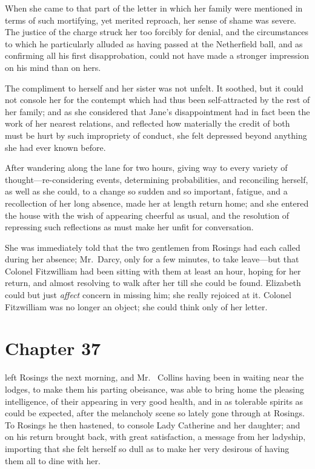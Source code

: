 When she came to that part of the letter in which her family were
mentioned in terms of such mortifying, yet merited reproach, her
sense of shame was severe.  The justice of the charge struck her
too forcibly for denial, and the circumstances to which he
particularly alluded as having passed at the Netherfield ball,
and as confirming all his first disapprobation, could not have
made a stronger impression on his mind than on hers.

The compliment to herself and her sister was not unfelt.  It
soothed, but it could not console her for the contempt which had
thus been self-attracted by the rest of her family; and as she
considered that Jane's disappointment had in fact been the work
of her nearest relations, and reflected how materially the credit
of both must be hurt by such impropriety of conduct, she felt
depressed beyond anything she had ever known before.

After wandering along the lane for two hours, giving way to
every variety of thought---re-considering events, determining
probabilities, and reconciling herself, as well as she could, to
a change so sudden and so important, fatigue, and a recollection
of her long absence, made her at length return home; and she
entered the house with the wish of appearing cheerful as usual,
and the resolution of repressing such reflections as must make
her unfit for conversation.

She was immediately told that the two gentlemen from Rosings
had each called during her absence; Mr.\ Darcy, only for a few
minutes, to take leave---but that Colonel Fitzwilliam had been
sitting with them at least an hour, hoping for her return, and
almost resolving to walk after her till she could be found.
Elizabeth could but just \emph{affect} concern in missing him; she
really rejoiced at it.  Colonel Fitzwilliam was no longer an
object; she could think only of her letter.



\chapter{Chapter 37}


 left Rosings the next morning, and Mr.\ %
Collins having been in waiting near the lodges, to make them
his parting obeisance, was able to bring home the pleasing
intelligence, of their appearing in very good health, and in as
tolerable spirits as could be expected, after the melancholy scene
so lately gone through at Rosings.  To Rosings he then hastened,
to console Lady Catherine and her daughter; and on his return
brought back, with great satisfaction, a message from her
ladyship, importing that she felt herself so dull as to make
her very desirous of having them all to dine with her.

